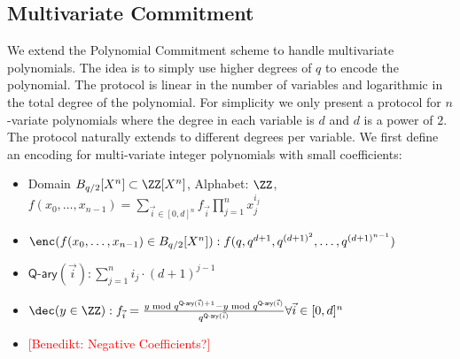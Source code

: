 \documentclass{article}
\theoremstyle{definition}
\newcommand{\benedikt}[1]{{\textcolor{red}{[Benedikt: #1]}}}
\newcommand{\benedikt}[1]{}
\begin{document}
\subsection{Multivariate Commitment}
  We extend the Polynomial Commitment scheme to handle multivariate polynomials. The idea is to simply use higher degrees of $q$ to encode the polynomial. The protocol is linear in the number of variables and logarithmic in the total degree of the polynomial. For simplicity we only present a protocol for $n$-variate polynomials where the degree in each variable is $d$ and $d$ is a power of $2$. The protocol naturally extends to different degrees per variable.
We first define an encoding for multi-variate integer polynomials with small coefficients:
 \begin{itemize}
	\item Domain $B_{q/2}[X^n] \subset \ZZ[X^n]$, Alphabet: $\ZZ$, \\$f(x_0,\dots,x_{n-1})=\sum_{\vec{i} \in [0,d]^n} f_{\vec{i}} \prod_{j=1}^{n} x_j^{i_j}$
	\item $\enc(f(x_0,\dots,x_{n-1}) \in B_{q/2}[X^n]): f(q,q^{d+1},q^{(d+1)^2},\dots,q^{(d+1)^{n-1}})$
	\item $\textsf{Q-ary}(\vec{i}):\sum_{j=1}^{n} i_j\cdot (d+1)^{j-1}$
	\item $\dec(y \in \ZZ): f_{\vec{i}}=\frac{y \bmod q^{\textsf{Q-ary}(\vec{i})+1}-y \bmod q^{\textsf{Q-ary}(\vec{i})}}{q^{\textsf{Q-ary}(\vec{i})}} \forall \vec{i} \in [0,d]^n$
	\item \benedikt{Negative Coefficients?}

\end{itemize}
\end{document}
